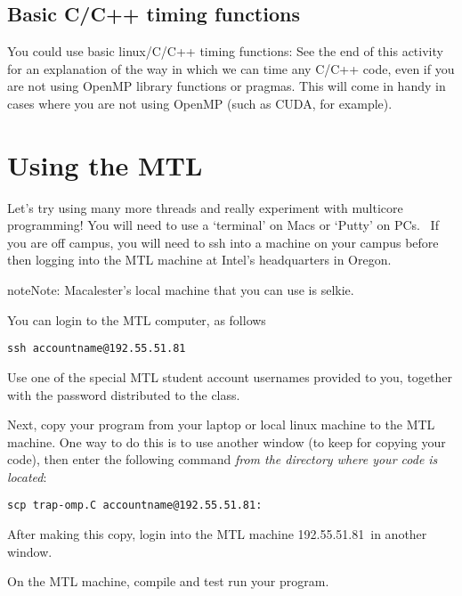 \documentclass[letterpaper,10pt,openany,oneside]{sphinxmanual}
\begin{document}
\subsection{Basic C/C++ timing functions}
\label{timingAndScalability/TimingOnMTLandscalability:basic-c-c-timing-functions}
You could use basic linux/C/C++ timing functions: See the end of this
activity for an explanation of the way in which we can time any C/C++
code, even if you are not using OpenMP library functions or pragmas. This will come in handy in cases where you are not using OpenMP (such as CUDA, for example).


\section{Using the MTL}
\label{timingAndScalability/TimingOnMTLandscalability:using-the-mtl}
Let’s try using many more threads and really experiment with multicore
programming! You will need to use a ‘terminal’ on Macs or ‘Putty’ on
PCs.  If you are off campus, you will need to ssh into a machine on your campus before
then logging into the MTL machine at Intel’s headquarters in Oregon.

\begin{notice}{note}{Note:}
Macalester's local machine that you can use is selkie.
\end{notice}

You can login to the MTL computer, as follows

\begin{Verbatim}[commandchars=\\\{\}]
ssh accountname@192.55.51.81
\end{Verbatim}

Use one of the special MTL student account usernames provided to you, together with
the password distributed to the class.

Next, copy your program from your laptop or local linux machine to the MTL machine.
One way to do this is to use another window (to
keep for copying your code), then enter the following command \emph{from the directory where your code is located}:

\begin{Verbatim}[commandchars=\\\{\}]
scp trap-omp.C accountname@192.55.51.81:
\end{Verbatim}

After making this copy, login into the MTL machine 192.55.51.81 in another window.

On the MTL machine, compile and test run your program.
\end{document}
